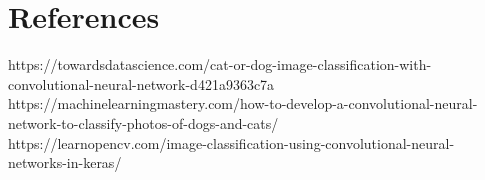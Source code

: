\documentclass{article}
\begin{document}
\section{ References}
https://towardsdatascience.com/cat-or-dog-image-classification-with-convolutional-neural-network-d421a9363c7a\\
https://machinelearningmastery.com/how-to-develop-a-convolutional-neural-network-to-classify-photos-of-dogs-and-cats/\\
https://learnopencv.com/image-classification-using-convolutional-neural-networks-in-keras/\\
\end{document}
